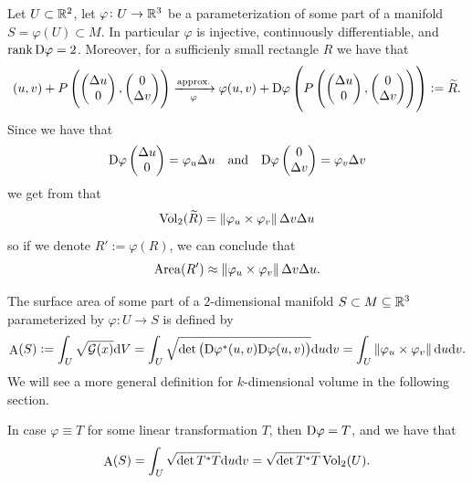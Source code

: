 \documentclass[11pt,a4paper]{article}
\DeclareMathOperator{\A}{A} %
\begin{document}
\begin{example}
  Let $U \subset \mathbb{R}^2$,
  let $\varphi \colon U \to \mathbb{R}^3$ be a parameterization of some
  part of a manifold $S = \varphi(U) \subset M$.
  In particular $\varphi$ is injective, continuously differentiable,
  and $\operatorname{rank} \mathrm{D} \varphi = 2$.
  Moreover, for a sufficienly small rectangle $R$ we have that
  \[
    (u,v) +
    P\del{\begin{pmatrix} \Delta u \\ 0 \end{pmatrix},
    \begin{pmatrix} 0 \\ \Delta v \end{pmatrix}}
    \xrightarrow[\varphi]{\text{approx.}}
    \varphi(u,v) +
    \Dif \varphi \del{P\del{\begin{pmatrix} \Delta u \\ 0 \end{pmatrix},
    \begin{pmatrix} 0 \\ \Delta v \end{pmatrix}}} := \widetilde R.
  \]
  Since we have that
  \[
    \mathrm{D} \varphi \begin{pmatrix} \Delta u \\ 0 \end{pmatrix} =
    \varphi_u \Delta u \quad \text{and} \quad
    \mathrm{D} \varphi \begin{pmatrix} 0 \\ \Delta v \end{pmatrix} =
    \varphi_v \Delta v
  \]
  we get from  that
  \[
    \operatorname{Vol}_2(\widetilde R) =
    \left\lVert\varphi_u \times \varphi_v\right\rVert \Delta v \Delta u
  \]
  so if we denote $R' := \varphi(R)$, we can conclude that
  \[
    \operatorname{Area}(R') \approx \left\lVert\varphi_u \times \varphi_v\right\rVert \Delta v \Delta u.
  \]
\end{example}

\begin{definition}
  \label{def:surface-area}
  The surface area of some part of a $2$-dimensional
  manifold $S \subset M \subseteq \mathbb{R}^3$ parameterized
  by $\varphi \colon U \to S$ is defined by
  \[
    \A(S) :=
    \int_{U} \sqrt{\mathcal G(x)} \dV =
    \int_{U} \sqrt{\det\del{\Dif \varphi^*(u,v) \Dif \varphi(u,v)}} \du \dv =
    \int_{U} \norm{\varphi_u \times \varphi_v} \du \dv.
  \]
  We will see a more general definition for $k$-dimensional volume
  in the following section.
\end{definition}
\begin{remark}
  In case $\varphi \equiv T$ for some linear transformation $T$,
  then $\mathrm{D} \varphi = T$, and we have that
  \[
    \A(S) =
    \int_{U} \sqrt{\det T^* T} \du \dv =
    \sqrt{\det T^* T} \Vol_2(U).
  \]
\end{remark}
\end{document}

